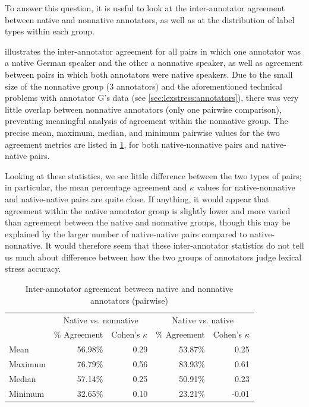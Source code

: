 		
		To answer this question, it is useful to look at the inter-annotator agreement between native and nonnative annotators, as well as at the distribution of label types within each group. 
		
		 illustrates the inter-annotator agreement for all pairs in which one annotator was a native German speaker and the other a nonnative speaker, as well as agreement between pairs in which both annotators were native speakers. Due to the small size of the nonnative group (3 annotators) and the aforementioned technical problems with annotator G's data (see \cref{sec:lexstress:annotators}), there was very little overlap between nonnative annotators (only one pairwise comparison), preventing meaningful analysis of agreement within the nonnative group. The precise mean, maximum, median, and minimum pairwise values for the two agreement metrics are listed in \cref{tab:agreement:L1}, for both  native-nonnative pairs and native-native pairs. 
		
		Looking at these statistics, we see little difference between the two types of pairs; in particular, the mean percentage agreement and $\kappa$ values for native-nonnative and native-native pairs are quite close. If anything, it would appear that agreement within the native annotator group is slightly lower and more varied than agreement between the native and nonnative groups, though this may be explained by the larger number of native-native pairs compared to native-nonnative. It would therefore seem that these inter-annotator statistics do not tell us much about difference between how the two groups of annotators judge lexical stress accuracy.
		
		
		\begin{table}[tb]
			\centering
			\caption{Inter-annotator agreement between native and nonnative annotators (pairwise)}
			\begin{tabular}{lrrrr}
			\toprule
			& \multicolumn{2}{c}{Native vs. nonnative} & \multicolumn{2}{c}{Native vs. native} \\
			\cmidrule(lr){2-3} \cmidrule(lr){4-5}
			& \% Agreement & Cohen's $\kappa$ & \% Agreement & Cohen's $\kappa$  \\
			\midrule
Mean	&56.98\%	 & 0.29  & 53.87\%	& 0.25\\
Maximum&	76.79\%	& 0.56 & 83.93\%	 & 0.61\\
Median	& 57.14\%	 &0.25 &  50.91\%	& 0.23 \\
Minimum	&32.65\%	 & 0.10 &  23.21\% &	-0.01\\
			\bottomrule
			\end{tabular}
			\label{tab:agreement:L1}
		\end{table} 
		
